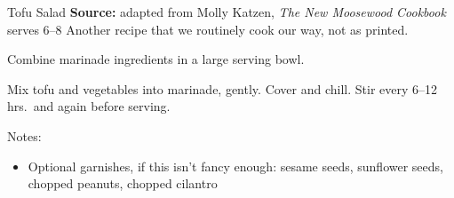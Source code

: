 \begin{recipe}{Tofu Salad}{}%
 {\textbf{Source:} adapted from Molly Katzen, \textit{The New Moosewood Cookbook} \hfill serves 6--8}
 \freeform Another recipe that we routinely cook our way, not as printed.

 Combine marinade ingredients in a large serving bowl.

 Mix tofu and vegetables into marinade, gently. Cover and chill. Stir every 6--12 hrs.\ and again before serving.

 \freeform Notes:
 \begin{itemize}
  \item Optional garnishes, if this isn't fancy enough: sesame seeds, sunflower seeds, chopped peanuts, chopped cilantro
 \end{itemize}

\end{recipe}
